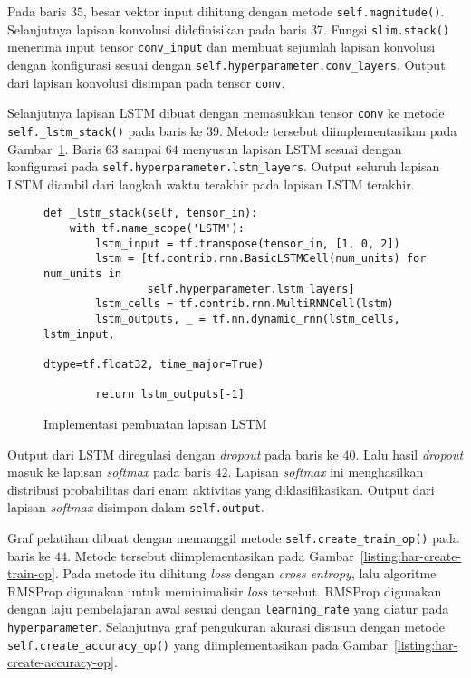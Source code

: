 Pada baris $35$, besar vektor input dihitung dengan metode \texttt{self.magnitude()}. Selanjutnya lapisan konvolusi didefinisikan pada baris $37$. Fungsi \texttt{slim.stack()} menerima input tensor \texttt{conv_input} dan membuat sejumlah lapisan konvolusi dengan konfigurasi sesuai dengan \texttt{self.hyperparameter.conv_layers}. Output dari lapisan konvolusi disimpan pada tensor \texttt{conv}.

Selanjutnya lapisan LSTM dibuat dengan memasukkan tensor \texttt{conv} ke metode \texttt{self._lstm_stack()} pada baris ke $39$. Metode tersebut diimplementasikan pada Gambar~\ref{listing:har-lstm-stack}. Baris $63$ sampai $64$ menyusun lapisan LSTM  sesuai dengan konfigurasi pada \texttt{self.hyperparameter.lstm_layers}. Output seluruh lapisan LSTM diambil dari langkah waktu terakhir pada lapisan LSTM terakhir.

\begin{figure}[h]
\begin{verbatim}
def _lstm_stack(self, tensor_in):
    with tf.name_scope('LSTM'):
        lstm_input = tf.transpose(tensor_in, [1, 0, 2])
        lstm = [tf.contrib.rnn.BasicLSTMCell(num_units) for num_units in
                self.hyperparameter.lstm_layers]
        lstm_cells = tf.contrib.rnn.MultiRNNCell(lstm)
        lstm_outputs, _ = tf.nn.dynamic_rnn(lstm_cells, lstm_input,
                                            dtype=tf.float32, time_major=True)

        return lstm_outputs[-1]
\end{verbatim}
\caption{Implementasi pembuatan lapisan LSTM}
\label{listing:har-lstm-stack}
\end{figure}

Output dari LSTM diregulasi dengan \textit{dropout} pada baris ke $40$. Lalu hasil \textit{dropout} masuk ke lapisan \textit{softmax} pada baris $42$. Lapisan \textit{softmax} ini menghasilkan distribusi probabilitas dari enam aktivitas yang diklasifikasikan. Output dari lapisan \textit{softmax} disimpan dalam \texttt{self.output}.

Graf pelatihan dibuat dengan memanggil metode  \texttt{self.create_train_op()} pada baris ke $44$. Metode tersebut diimplementasikan pada Gambar~\ref{listing:har-create-train-op}. Pada metode itu dihitung \textit{loss} dengan \textit{cross entropy}, lalu algoritme RMSProp digunakan untuk meminimalisir \textit{loss} tersebut. RMSProp digunakan dengan laju pembelajaran awal sesuai dengan \texttt{learning_rate} yang diatur pada \texttt{hyperparameter}. Selanjutnya graf pengukuran akurasi disusun dengan metode \texttt{self.create_accuracy_op()} yang diimplementasikan pada Gambar~\ref{listing:har-create-accuracy-op}.

